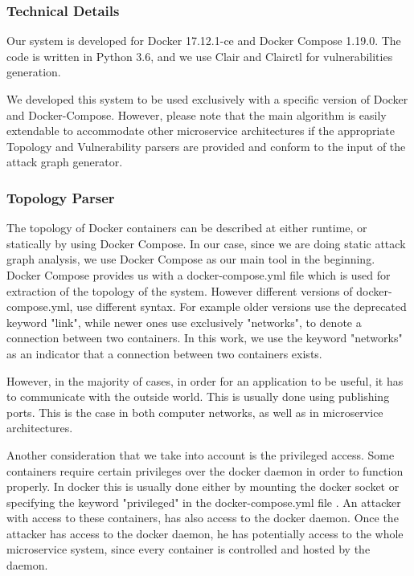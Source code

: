 \documentclass[letterpaper, 10 pt, conference]{ieeeconf}  %
\begin{document}
\subsubsection{Technical Details}
Our system is developed for Docker 17.12.1-ce and Docker Compose 1.19.0. The code is written in Python 3.6, and we use Clair\cite{clair} and Clairctl\cite{clairctl} for vulnerabilities generation.

We developed this system to be used exclusively with a specific version of Docker and Docker-Compose. However, please note that the main algorithm is easily extendable to accommodate other microservice architectures if the appropriate Topology and Vulnerability parsers are provided and conform to the input of the attack graph generator.

\subsubsection{Topology Parser}
The topology of Docker containers can be described at either runtime, or statically by using Docker Compose. In our case, since we are doing static attack graph analysis, we use Docker Compose as our main tool in the beginning. Docker Compose provides us with a docker-compose.yml file which is used for extraction of the topology of the system. However different versions of docker-compose.yml, use different syntax. For example older versions use the deprecated keyword "link", while newer ones use exclusively "networks", to denote a connection between two containers. In this work, we use the keyword "networks" as an indicator that a connection between two containers exists.

However, in the majority of cases, in order for an application to be useful, it has to communicate with the outside world. This is usually done using publishing ports. This is the case in both computer networks, as well as in microservice architectures.

Another consideration that we take into account is the privileged access. Some containers require certain privileges over the docker daemon in order to function properly. In docker this is usually done either by mounting the docker socket or specifying the keyword "privileged" in the docker-compose.yml file . An attacker with access to these containers, has also access to the docker daemon. Once the attacker has access to the docker daemon, he has potentially access to the whole microservice system, since every container is controlled and hosted by the daemon.
\end{document}
